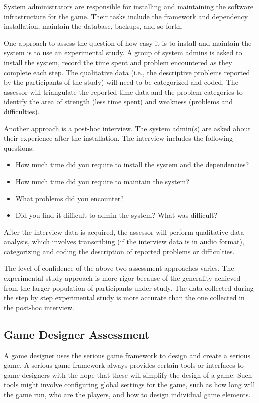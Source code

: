 \documentclass[11pt]{article}
\begin{document}
System administrators are responsible for installing and maintaining the software infrastructure
for the game. Their tasks include the framework and dependency installation, maintain the database, backups, and so forth.

One approach to assess the question of how easy it is to install and maintain the system is to use
an experimental study. A group of system admins is asked to install the system, record the time
spent and problem encountered as they complete each step. The qualitative data (i.e., the
descriptive problems reported by the participants of the study) will need to be categorized and
coded. The assessor will triangulate the reported time data and the problem categories to identify
the area of strength (less time spent) and weakness (problems and difficulties).

Another approach is a post-hoc interview. The system admin(s) are asked about their experience
after the installation. The interview includes the following questions:

\begin{itemize}
\item How much time did you require to install the system and the dependencies?
\item How much time did you require to maintain the system?
\item What problems did you encounter?
\item Did you find it difficult to admin the system? What was difficult?
\end{itemize}

After the interview data is acquired, the assessor will perform qualitative data
analysis, which involves transcribing (if the interview data is in audio format),
categorizing and coding the description of reported problems or difficulties.

The level of confidence of the above two assessment approaches varies. The experimental study
approach is more rigor because of the generality achieved from the larger population of
participants under study. The data collected during the step by step experimental study is more
accurate than the one collected in the post-hoc interview.

\subsection{Game Designer Assessment}

A game designer uses the serious game framework to design and create a serious game.
A serious game framework always provides certain tools or interfaces to game designers
with the hope that these will simplify the design of a game. Such tools might involve
configuring global settings for the game, such as how long will the game run, who are the
players, and how to design individual game elements.
\end{document}
